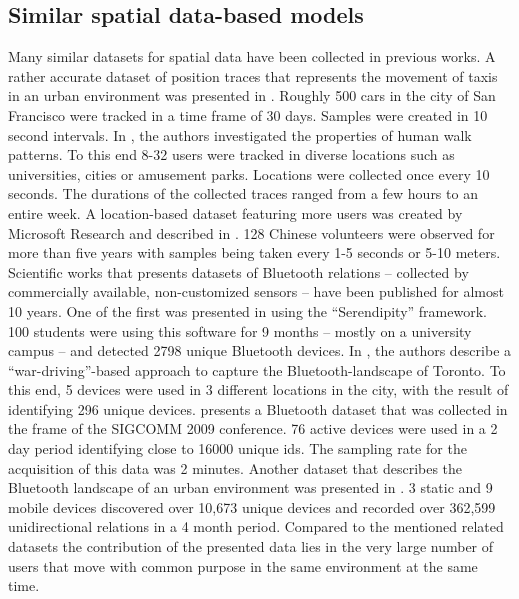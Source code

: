 \documentclass[12pt,a4paper,twoside,openright]{book}
\begin{document}
\subsection{Similar spatial data-based models}
\label{subsec:similar-models}

Many similar datasets for spatial data have been collected in previous works.
%
A rather accurate dataset of position traces that represents the movement of taxis in an urban environment was presented in \cite{jetcheva2003}.
%
Roughly 500 cars in the city of San Francisco were tracked in a time frame of 30 days.
%
Samples were created in 10 second intervals.
%
In \cite{lee2009}, the authors investigated the properties of human walk patterns.
%
To this end 8-32 users were tracked in diverse locations such as universities, cities or amusement parks.
%
Locations were collected once every 10 seconds.
%
The durations of the collected traces ranged from a few hours to an entire week.
%
A location-based dataset featuring more users was created by Microsoft Research and described in \cite{zheng2008}.
%
128 Chinese volunteers were observed for more than five years with samples being taken every 1-5 seconds or 5-10 meters.
%
Scientific works that presents datasets of Bluetooth relations -- collected by commercially available, non-customized sensors -- have been published for almost 10 years.
%
One of the first was presented in \cite{eagle2005} using the ``Serendipity'' framework.
%
100 students were using this software for 9 months -- mostly on a university campus -- and detected 2798 unique Bluetooth devices.
%
In \cite{Su2006}, the authors describe a ``war-driving''-based approach to capture the Bluetooth-landscape of Toronto.
%
To this end, 5 devices were used in 3 different locations in the city, with the result of identifying 296 unique devices.
%
\cite{Pietilainen2012} presents a Bluetooth dataset that was collected in the frame of the SIGCOMM 2009 conference.
%
76 active devices were used in a 2 day period identifying close to 16000 unique ids.
%
The sampling rate for the acquisition of this data was 2 minutes.
%
Another dataset that describes the Bluetooth landscape of an urban environment was presented in \cite{Natarajan2007}.
%
3 static and 9 mobile devices discovered over 10,673 unique devices and recorded over 362,599 unidirectional relations in a 4 month period.
%
Compared to the mentioned related datasets the contribution of the presented data lies in the very large number of users that move with common purpose in the same environment at the same time.
\end{document}
